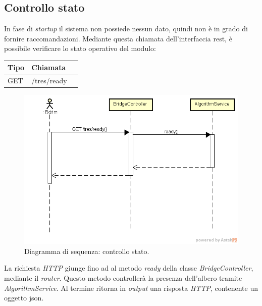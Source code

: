 \subsection{Controllo stato}
In fase di \emph{startup} il sistema non possiede nessun dato, quindi non è in grado di fornire raccomandazioni. Mediante questa chiamata dell'interfaccia \gls{rest}, è possibile verificare lo stato operativo del modulo:\\
\def\arraystretch{1.5}
\begin{longtable}{|p{2.5cm}|p{5cm}|l|}
\hline
\textbf{Tipo} &	\textbf{Chiamata}	\\\hline
GET		&	/tres/ready		 \\\hline
\end{longtable}
\begin{figure}[h]
\centering
\includegraphics[scale=0.43]{immagini/DScheckstate}
\caption{Diagramma di sequenza: controllo stato.}
\label{fig:seq-controllostato}
\end{figure}
La richiesta \emph{HTTP} giunge fino ad al metodo \emph{ready} della classe \emph{BridgeController}, mediante il \emph{router}. Questo metodo controllerà la presenza dell'albero tramite \emph{AlgorithmService}. Al termine ritorna in \emph{output} una risposta \emph{HTTP}, contenente un oggetto \gls{json}.
\newpage
